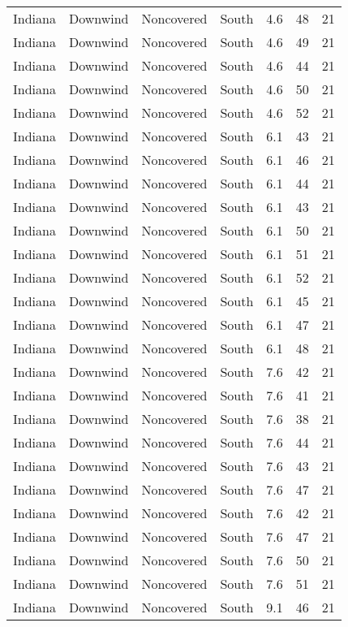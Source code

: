 \documentclass{article}
\begin{document}
\begin{longtable}[H]{ccccccc}
Indiana & Downwind & Noncovered & South  & 4.6  & 48 & 21 \\
Indiana & Downwind & Noncovered & South  & 4.6  & 49 & 21 \\
Indiana & Downwind & Noncovered & South  & 4.6  & 44 & 21 \\
Indiana & Downwind & Noncovered & South  & 4.6  & 50 & 21 \\
Indiana & Downwind & Noncovered & South  & 4.6  & 52 & 21 \\
Indiana & Downwind & Noncovered & South  & 6.1  & 43 & 21 \\
Indiana & Downwind & Noncovered & South  & 6.1  & 46 & 21 \\
Indiana & Downwind & Noncovered & South  & 6.1  & 44 & 21 \\
Indiana & Downwind & Noncovered & South  & 6.1  & 43 & 21 \\
Indiana & Downwind & Noncovered & South  & 6.1  & 50 & 21 \\
Indiana & Downwind & Noncovered & South  & 6.1  & 51 & 21 \\
Indiana & Downwind & Noncovered & South  & 6.1  & 52 & 21 \\
Indiana & Downwind & Noncovered & South  & 6.1  & 45 & 21 \\
Indiana & Downwind & Noncovered & South  & 6.1  & 47 & 21 \\
Indiana & Downwind & Noncovered & South  & 6.1  & 48 & 21 \\
Indiana & Downwind & Noncovered & South  & 7.6  & 42 & 21 \\
Indiana & Downwind & Noncovered & South  & 7.6  & 41 & 21 \\
Indiana & Downwind & Noncovered & South  & 7.6  & 38 & 21 \\
Indiana & Downwind & Noncovered & South  & 7.6  & 44 & 21 \\
Indiana & Downwind & Noncovered & South  & 7.6  & 43 & 21 \\
Indiana & Downwind & Noncovered & South  & 7.6  & 47 & 21 \\
Indiana & Downwind & Noncovered & South  & 7.6  & 42 & 21 \\
Indiana & Downwind & Noncovered & South  & 7.6  & 47 & 21 \\
Indiana & Downwind & Noncovered & South  & 7.6  & 50 & 21 \\
Indiana & Downwind & Noncovered & South  & 7.6  & 51 & 21 \\
Indiana & Downwind & Noncovered & South  & 9.1  & 46 & 21 \\

\end{longtable}
\end{document}
